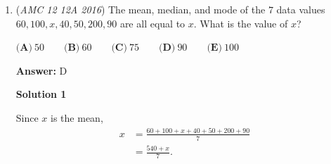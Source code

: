 \begin{enumerate}
 $\textbf{(A) } -\frac{3}{8} \qquad \textbf{(B) } -\frac{1}{40} \qquad \textbf{(C) } 0 \qquad \textbf{(D) } \frac{3}{8} \qquad \textbf{(E) } \frac{31}{40}$

 \textbf{Answer: }B



\textbf{Solution 1}

The value, by definition, is 
 \begin{align*} \text{rem}\left(\frac{3}{8},-\frac{2}{5}\right) &= \frac{3}{8}-\left(-\frac{2}{5}\right)\left\lfloor\frac{\frac{3}{8}}{-\frac{2}{5}}\right\rfloor \\ &= \frac{3}{8}-\left(-\frac{2}{5}\right)\left\lfloor\frac{3}{8}\times\frac{-5}{2}\right\rfloor \\ &= \frac{3}{8}-\left(-\frac{2}{5}\right)\left\lfloor\frac{-15}{16}\right\rfloor\\ &= \frac{3}{8}-\left(-\frac{2}{5}\right)\left(-1\right)\\ &= \frac{3}{8}-\frac{2}{5}\\ &= \boxed{\textbf{(B) } -\frac{1}{40}}. \end{align*}





\textbf{Solution 2}

Do note that the denominator of the answer will be a multiple of 5 and 8 (40) and that the answer will also be negative. The only answer choice that satisfies this is $\boxed{B}$
\begin{verbatim}
\href{https://youtu.be/pu\_Hqo5sfWs}{https://youtu.be/pu\_Hqo5sfWs}
\end{verbatim}





	\item (\textit{AMC 12 12A 2016}) The mean, median, and mode of the $7$ data values $60, 100, x, 40, 50, 200, 90$ are all equal to $x$. What is the value of $x$?


 $\textbf{(A)}\ 50\qquad\textbf{(B)}\ 60\qquad\textbf{(C)}\ 75\qquad\textbf{(D)}\ 90\qquad\textbf{(E)}\ 100$

 \textbf{Answer: }D



\textbf{Solution 1}

Since $x$ is the mean,
 \begin{align*} x&=\frac{60+100+x+40+50+200+90}{7}\\ &=\frac{540+x}{7}. \end{align*}



\end{enumerate}
